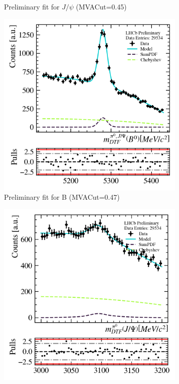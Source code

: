 \begin{figure}
\begin{subfigure}{0.49\textwidth}
        \caption*{Preliminary fit for $J/\psi$ (MVACut=0.45)}
        \label{fig:prefit_mvascan_mvacut040_b}
    \end{subfigure}
    \begin{subfigure}{0.49\textwidth}
        \includegraphics[width=\textwidth]{./OutputFiles/PNGPlots/PreliminaryFit/MVAScan/b1dfit_mva0.47_jpsichannel.png}
        \caption*{Preliminary fit for B (MVACut=0.47)}
        \label{fig:prefit_mvascan_mvacut040_b}
    \end{subfigure}
    \begin{subfigure}{0.49\textwidth}
        \includegraphics[width=\textwidth]{./OutputFiles/PNGPlots/PreliminaryFit/MVAScan/jpsi1dfit_mva0.47_jpsichannel.png}

\end{subfigure}
\end{figure}
